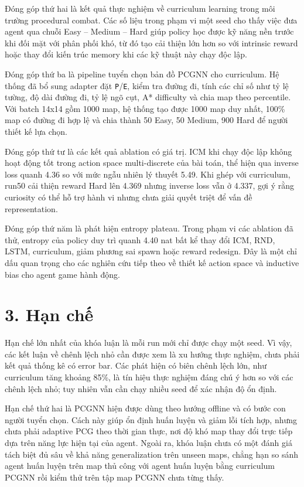 Đóng góp thứ hai là kết quả thực nghiệm về curriculum learning trong môi trường procedural combat. Các số liệu trong phạm vi một seed cho thấy việc đưa agent qua chuỗi Easy -- Medium -- Hard giúp policy học được kỹ năng nền trước khi đối mặt với phân phối khó, từ đó tạo cải thiện lớn hơn so với intrinsic reward hoặc thay đổi kiến trúc memory khi các kỹ thuật này chạy độc lập.

Đóng góp thứ ba là pipeline tuyển chọn bản đồ PCGNN cho curriculum. Hệ thống đã bổ sung adapter đặt \texttt{P}/\texttt{E}, kiểm tra đường đi, tính các chỉ số như tỷ lệ tường, độ dài đường đi, tỷ lệ ngõ cụt, A* difficulty và chia map theo percentile. Với batch 14x14 gồm 1000 map, hệ thống tạo được 1000 map duy nhất, 100\% map có đường đi hợp lệ và chia thành 50 Easy, 50 Medium, 900 Hard để người thiết kế lựa chọn.

Đóng góp thứ tư là các kết quả ablation có giá trị. ICM khi chạy độc lập không hoạt động tốt trong action space multi-discrete của bài toán, thể hiện qua inverse loss quanh 4.36 so với mức ngẫu nhiên lý thuyết 5.49. Khi ghép với curriculum, run50 cải thiện reward Hard lên 4.369 nhưng inverse loss vẫn ở 4.337, gợi ý rằng curiosity có thể hỗ trợ hành vi nhưng chưa giải quyết triệt để vấn đề representation.

Đóng góp thứ năm là phát hiện entropy plateau. Trong phạm vi các ablation đã thử, entropy của policy duy trì quanh 4.40 nat bất kể thay đổi ICM, RND, LSTM, curriculum, giảm phương sai spawn hoặc reward redesign. Đây là một chỉ dấu quan trọng cho các nghiên cứu tiếp theo về thiết kế action space và inductive bias cho agent game hành động.

\section*{3. Hạn chế}

Hạn chế lớn nhất của khóa luận là mỗi run mới chỉ được chạy một seed. Vì vậy, các kết luận về chênh lệch nhỏ cần được xem là xu hướng thực nghiệm, chưa phải kết quả thống kê có error bar. Các phát hiện có biên chênh lệch lớn, như curriculum tăng khoảng 85\%, là tín hiệu thực nghiệm đáng chú ý hơn so với các chênh lệch nhỏ; tuy nhiên vẫn cần chạy nhiều seed để xác nhận độ ổn định.

Hạn chế thứ hai là PCGNN hiện được dùng theo hướng offline và có bước con người tuyển chọn. Cách này giúp ổn định huấn luyện và giảm lỗi tích hợp, nhưng chưa phải adaptive PCG theo thời gian thực, nơi độ khó map thay đổi trực tiếp dựa trên năng lực hiện tại của agent. Ngoài ra, khóa luận chưa có một đánh giá tách biệt đủ sâu về khả năng generalization trên unseen maps, chẳng hạn so sánh agent huấn luyện trên map thủ công với agent huấn luyện bằng curriculum PCGNN rồi kiểm thử trên tập map PCGNN chưa từng thấy.

